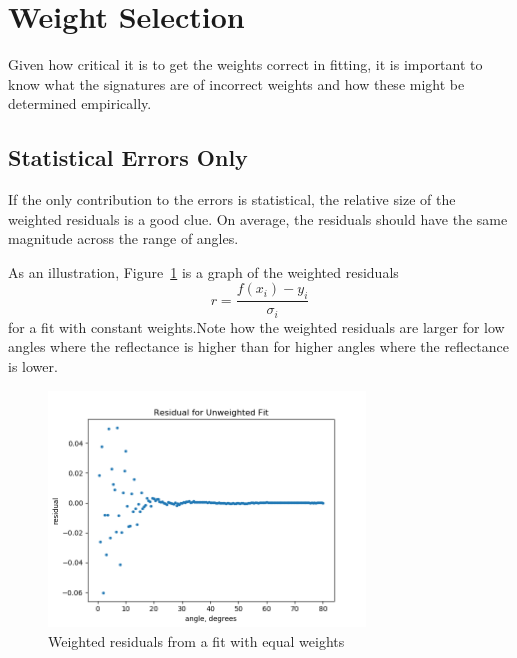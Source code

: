 \documentclass[english]{scrartcl}
\begin{document}
\section{Weight Selection}
Given how critical it is to get the weights correct in
fitting, it is important to know what the signatures are
of incorrect weights and how these might be determined
empirically.
\subsection{Statistical Errors Only}
If the only contribution to the errors is statistical,
the relative size of the weighted residuals is a good
clue. On average, the residuals should have the same
magnitude across the range of angles.

As an illustration, Figure~\ref{fig:res-equalweight}
is a graph of the weighted residuals
\begin{equation}
r=\frac{f(x_i)-y_i}{\sigma_i}
\end{equation}
for a fit with constant weights.Note how the weighted
residuals are larger for low angles where the reflectance
is higher than for higher angles where the reflectance
is lower.
\begin{figure}[htb]
  \begin{center}
    \includegraphics[width=0.75\textwidth]{images/res-equalweight}
  \end{center}
  \caption{\label{fig:res-equalweight}Weighted residuals
  from a fit with equal weights}
\end{figure}
\end{document}
